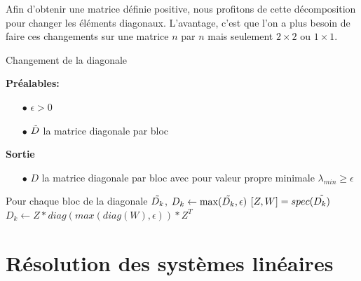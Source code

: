 Afin d'obtenir une matrice d\'efinie positive, nous profitons de cette d\'ecomposition pour changer les \'el\'ements diagonaux.
L'avantage, c'est que l'on a plus besoin de faire ces changements sur une matrice $n$ par $n$ mais seulement $2\times2$ ou $1\times1$.

\begin{algorithm}                     %
\caption{Changement de la diagonale}          %
\label{alg:diag}                           %
\begin{algorithmic}
\STATE \textbf{Pr\'ealables:} %
\begin{itemize}
\item[$\bullet$] $\epsilon>0$
\item[$\bullet$] $\Tilde{D}$ la matrice diagonale par bloc
\end{itemize}
\STATE \textbf{Sortie} %
\begin{itemize}
\item[$\bullet$] $D$ la matrice diagonale par bloc avec pour valeur 
propre minimale $\lambda_{min} \geq \epsilon$
\end{itemize}

\STATE Pour chaque bloc de la diagonale $\Tilde{D_k}$,
\STATE $D_k\leftarrow \max(\Tilde{D_k},\epsilon)$
\ELSE 
\STATE $[Z,W]=spec(\Tilde{D_k)}$
\STATE $D_k\leftarrow Z*diag(max(diag(W),\epsilon))*Z^T$
\ENDIF
\end{algorithmic}
\end{algorithm}


% 



\section{R\'esolution des syst\`emes lin\'eaires}

